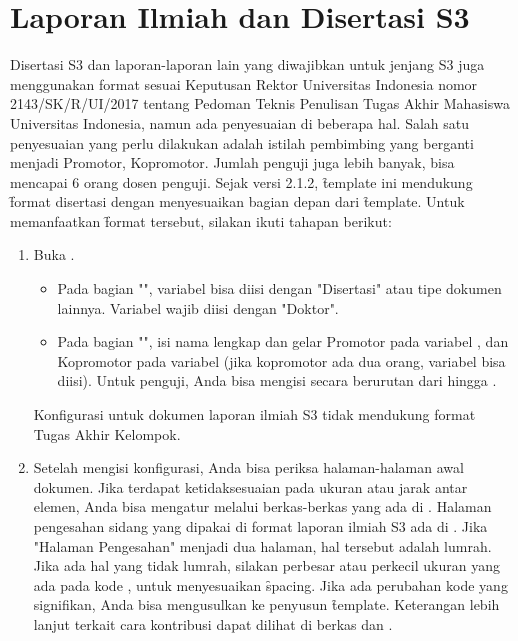 \section{Laporan Ilmiah dan Disertasi S3}
\label{sec:disertasi}
Disertasi S3 dan laporan-laporan lain yang diwajibkan untuk jenjang S3 juga menggunakan format sesuai Keputusan Rektor Universitas Indonesia nomor 2143/SK/R/UI/2017 tentang Pedoman Teknis Penulisan Tugas Akhir Mahasiswa Universitas Indonesia, namun ada penyesuaian di beberapa hal.
Salah satu penyesuaian yang perlu dilakukan adalah istilah pembimbing yang berganti menjadi Promotor, Kopromotor.
Jumlah penguji juga lebih banyak, bisa mencapai 6 orang dosen penguji.
Sejak versi 2.1.2, \f{template} ini mendukung \f{format} disertasi dengan menyesuaikan bagian depan dari \f{template}.
Untuk memanfaatkan \f{format} tersebut, silakan ikuti tahapan berikut:
\begin{enumerate}
	\item Buka .
	\begin{itemize}
		\item Pada bagian "", variabel  bisa diisi dengan "Disertasi" atau tipe dokumen lainnya.
		Variabel  wajib diisi dengan "Doktor".
		\item Pada bagian "", isi nama lengkap dan gelar Promotor pada variabel , dan Kopromotor pada variabel   (jika kopromotor ada dua orang, variabel   bisa diisi).
		Untuk penguji, Anda bisa mengisi secara berurutan dari   hingga .
	\end{itemize}
	Konfigurasi untuk dokumen laporan ilmiah S3 tidak mendukung format Tugas Akhir Kelompok.
	\item Setelah mengisi konfigurasi, Anda bisa periksa halaman-halaman awal dokumen.
	Jika terdapat ketidaksesuaian pada ukuran atau jarak antar elemen, Anda bisa mengatur melalui berkas-berkas yang ada di .
	Halaman pengesahan sidang yang dipakai di format laporan ilmiah S3 ada di .
	Jika "Halaman Pengesahan" menjadi dua halaman, hal tersebut adalah lumrah.
	Jika ada hal yang tidak lumrah, silakan perbesar atau perkecil ukuran yang ada pada kode , untuk menyesuaikan \f{spacing}.
	Jika ada perubahan kode yang signifikan, Anda bisa mengusulkan ke penyusun \f{template}.
	Keterangan lebih lanjut terkait cara kontribusi dapat dilihat di berkas  dan .
\end{enumerate}


